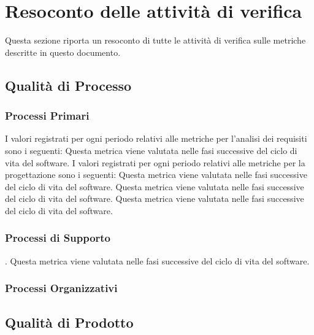 \section{Resoconto delle attività di verifica}
	Questa sezione riporta un resoconto di tutte le attività di verifica sulle metriche descritte in questo documento.

	\subsection{Qualità di Processo}
		\subsubsection{Processi Primari}
			I valori registrati per ogni periodo relativi alle metriche per l'analisi dei requisiti sono i seguenti:
				Questa metrica viene valutata nelle fasi successive del ciclo di vita del software.
				I valori registrati per ogni periodo relativi alle metriche per la progettazione sono i seguenti:
				Questa metrica viene valutata nelle fasi successive del ciclo di vita del software.
				Questa metrica viene valutata nelle fasi successive del ciclo di vita del software.
				Questa metrica viene valutata nelle fasi successive del ciclo di vita del software.
				 
		
		\subsubsection{Processi di Supporto}
				
				.
				Questa metrica viene valutata nelle fasi successive del ciclo di vita del software.
				
		\subsubsection{Processi Organizzativi}
			
	\subsection{Qualità di Prodotto}
